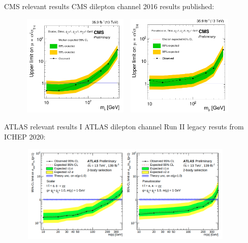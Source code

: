 \documentclass[8pt]{beamer}
\begin{document}
\begin{frame}{CMS relevant results}
\justifying
CMS dilepton channel 2016 results published: \vfill

\begin{figure}[htbp]
\centering
\begin{minipage}[b]{.5\textwidth}
\includegraphics[width=5.3cm, height=4.9cm]{figs/Juan_scalar_limits.png}
\end{minipage}\hfill
\begin{minipage}[b]{.5\textwidth}
\includegraphics[width=5.3cm, height=4.9cm]{figs/Juan_pseudo_limits.png}
\end{minipage}\hfill
\end{figure} \vfill
\end{frame}

\begin{frame}{ATLAS relevant results I}
\justifying
ATLAS dilepton channel Run II legacy resuts from ICHEP 2020: \vfill

 \begin{figure}[htbp]
\centering
\includegraphics[width=10.5cm, height=4.7cm]{figs/ATLASICHEP.png}
\end{figure} \vfill
\end{frame}
\end{document}
